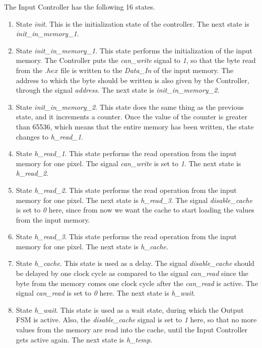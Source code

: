 \documentclass[11pt,a4paper]{article}
\begin{document}
The Input Controller has the following 16 states.
\begin{enumerate}
\item State \textit{init}. This is the initialization state of the controller. The next state is \textit{init\_in\_memory\_1}.

\item State \textit{init\_in\_memory\_1}. This state performs the initialization of the input memory. The Controller puts the  \textit{can\_write} signal to \textit{1}, so that the byte read from the $.hex$ file is written to the \textit{Data\_In} of the input memory. The address to which the byte should be written is also given by the Controller, through the signal \textit{address}. The next state is \textit{init\_in\_memory\_2}.

\item State \textit{init\_in\_memory\_2}. This state does the same thing as the previous state, and it increments a counter. Once the value of the counter is greater than 65536, which means that the entire memory has been written, the state changes to \textit{h\_read\_1}.

\item State \textit{h\_read\_1}. This state performs the read operation from the input memory for one pixel. The signal \textit{can\_write} is set to \textit{1}. The next state is \textit{h\_read\_2}.

\item State \textit{h\_read\_2}. This state performs the read operation from the input memory for one pixel. The next state is \textit{h\_read\_3}. The signal \textit{disable\_cache} is set to \textit{0} here, since from now we want the cache to start loading the values from the input memory. 

\item State \textit{h\_read\_3}. This state performs the read operation from the input memory for one pixel. The next state is \textit{h\_cache}.

\item State \textit{h\_cache}. This state is used as a delay. The signal \textit{disable\_cache} should be delayed by one clock cycle as compared to the signal \textit{can\_read} since the byte from the memory comes one clock cycle after the \textit{can\_read} is active. The signal \textit{can\_read} is set to \textit{0} here. The next state is \textit{h\_wait}.

\item State \textit{h\_wait}. This state is used as a wait state, during which the Output FSM is active. Also, the \textit{disable\_cache} signal is set to \textit{1} here, so that no more values from the memory are read into the cache, until the Input Controller gets active again. The next state is \textit{h\_temp}.


\end{enumerate}
\end{document}
